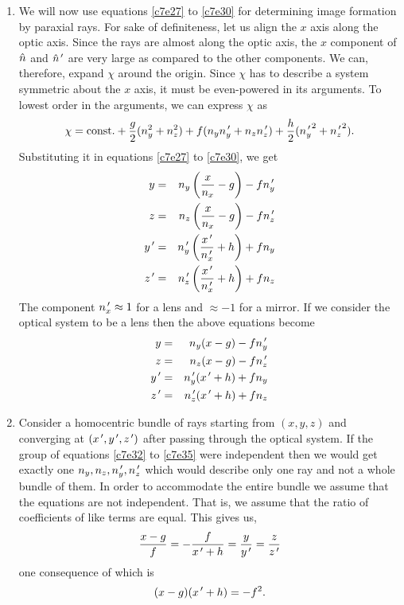 \begin{enumerate}
\item We will now use equations \eqref{c7e27} to \eqref{c7e30} for determining
image formation by paraxial rays. For sake of definiteness, let us align the $x$
axis along the optic axis. Since the rays are almost along the optic axis, the
$x$ component of $\hat{n}$ and $\hat{n}^{\,\prime}$ are very large as compared to the other
components. We can, therefore, expand $\chi$ around the origin. Since $\chi$ has
to describe a system symmetric about the $x$ axis, it must be even-powered in its
arguments. To lowest order in the arguments, we can express $\chi$ as
\begin{equation}\label{c7e31}
\chi = \text{const.} + \frac{g}{2}(n_y^2 + n_z^2) + f(n_yn_y^{\,\prime}+n_zn_z^{\,\prime})
+ \frac{h}{2}({n_y^{\,\prime}}^2 + {n_z^{\,\prime}}^2).
\end{equation}
Substituting it in equations \eqref{c7e27} to \eqref{c7e30}, we get
\begin{eqnarray*}
y &=& n_y\left(\frac{x}{n_x} - g\right) - fn_y^{\,\prime} \\
z &=& n_z\left(\frac{x}{n_x} - g\right) - fn_z^{\,\prime} \\
y^{\,\prime} &=& n_y^{\,\prime}\left(\frac{x^{\,\prime}}{n_x^{\,\prime}} + h\right) + fn_y \\
z^{\,\prime} &=& n_z^{\,\prime}\left(\frac{x^{\,\prime}}{n_x^{\,\prime}} + h\right) + fn_z
\end{eqnarray*}
The component $n_x^{\,\prime} \approx 1$ for a lens and $\approx -1$ for a 
mirror. If we consider the optical system to be a lens then the above equations 
become
\begin{eqnarray}
y &=& n_y(x - g) - fn_y^{\,\prime} \label{c7e32} \\
z &=& n_z(x - g) - fn_z^{\,\prime} \label{c7e33} \\
y^{\,\prime} &=& n_y^{\,\prime}(x^{\,\prime} + h) + fn_y \label{c7e34} \\
z^{\,\prime} &=& n_z^{\,\prime}(x^{\,\prime} + h) + fn_z \label{c7e35}
\end{eqnarray}

\item Consider a homocentric bundle of rays starting from $(x, y, z)$ and
converging at $(x^{\,\prime}, y^{\,\prime}, z^{\,\prime})$ after passing through the optical system.
If the group of equations \eqref{c7e32} to \eqref{c7e35} were independent then
we would get exactly one $n_y, n_z, n_y^{\,\prime}, n_z^{\,\prime}$ which would describe only
one ray and not a whole bundle of them. In order to accommodate the entire
bundle we assume that the equations are not independent. That is, we assume that
the ratio of coefficients of like terms are equal. This gives us,
\begin{equation}\label{c7e36}
\frac{x - g}{f} = -\frac{f}{x^{\,\prime} + h} = \frac{y}{y^{\,\prime}} = \frac{z}{z^{\,\prime}}
\end{equation}
one consequence of which is
\begin{equation}\label{c7e37}
(x - g)(x^{\,\prime} + h) = -f^2.
\end{equation}

\end{enumerate}
